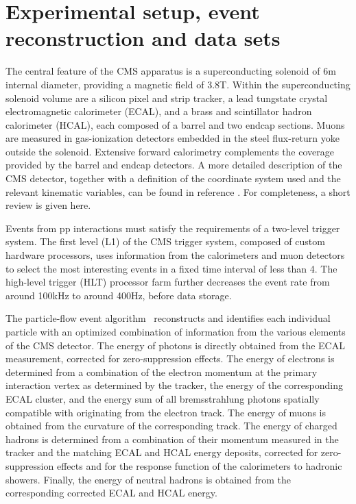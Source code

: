 \section{Experimental setup, event reconstruction and data sets}
\label{sect:CMSRec}


The central feature of the CMS apparatus is a superconducting solenoid of 6\unit{m} internal diameter, providing a magnetic field of 3.8\unit{T}. Within the superconducting solenoid volume are a silicon pixel and strip tracker, a lead tungstate crystal electromagnetic calorimeter (ECAL), and a brass and scintillator hadron calorimeter (HCAL), each composed of a barrel and two endcap sections. Muons are measured in gas-ionization detectors embedded in the steel flux-return yoke outside the solenoid. Extensive forward calorimetry complements the coverage provided by the barrel and endcap detectors. 
A more detailed description of the CMS detector, together with a definition of the coordinate system used and the relevant kinematic variables, can be found in reference \cite{Chatrchyan:2008zzk}.
For completeness, a short review is given here. 


Events from pp interactions must satisfy the requirements of a two-level trigger system.
The first level (L1) of the CMS trigger system, composed of custom hardware processors, uses information from the calorimeters and muon detectors to select the most interesting events in a fixed time interval of less than 4\mus. The high-level trigger (HLT) processor farm further decreases the event rate from around 100\unit{kHz} to around 400\unit{Hz}, before data storage. 

The particle-flow event algorithm~\cite{CMS-PAS-PFT-09-001,CMS-PAS-PFT-10-001} reconstructs and identifies each individual particle with an optimized combination of information from the various elements of the CMS detector. The energy of photons is directly obtained from the ECAL measurement, corrected for zero-suppression effects. The energy of electrons is determined from a combination of the electron momentum at the primary interaction vertex as determined by the tracker, the energy of the corresponding ECAL cluster, and the energy sum of all bremsstrahlung photons spatially compatible with originating from the electron track. The energy of muons is obtained from the curvature of the corresponding track. The energy of charged hadrons is determined from a combination of their momentum measured in the tracker and the matching ECAL and HCAL energy deposits, corrected for zero-suppression effects and for the response function of the calorimeters to hadronic showers. Finally, the energy of neutral hadrons is obtained from the corresponding corrected ECAL and HCAL energy. 

